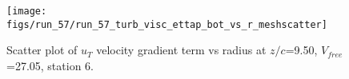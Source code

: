 \begin{figure}[H]
\centering
\texttt{[image: figs/run\_57/run\_57\_turb\_visc\_ettap\_bot\_vs\_r\_meshscatter]}
\caption{Scatter plot of $
u_T$ velocity gradient term vs radius at $z/c$=9.50, $V_{free}$=27.05, station 6.}
\end{figure}


